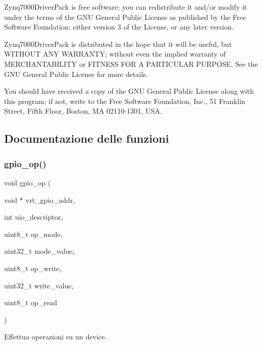 Zynq7000\+Driver\+Pack is free software; you can redistribute it and/or modify it under the terms of the G\+NU General Public License as published by the Free Software Foundation; either version 3 of the License, or any later version.

Zynq7000\+Driver\+Pack is distributed in the hope that it will be useful, but W\+I\+T\+H\+O\+UT A\+NY W\+A\+R\+R\+A\+N\+TY; without even the implied warranty of M\+E\+R\+C\+H\+A\+N\+T\+A\+B\+I\+L\+I\+TY or F\+I\+T\+N\+E\+SS F\+OR A P\+A\+R\+T\+I\+C\+U\+L\+AR P\+U\+R\+P\+O\+SE. See the G\+NU General Public License for more details.

You should have received a copy of the G\+NU General Public License along with this program; if not, write to the Free Software Foundation, Inc., 51 Franklin Street, Fifth Floor, Boston, MA 02110-\/1301, U\+SA. 

\subsection{Documentazione delle funzioni}
\mbox{\label{uio-int_8c_a78b676750c5d08c316cad35ec3963c53}} 
\subsubsection{\texorpdfstring{gpio\+\_\+op()}{gpio\_op()}}
{\footnotesize\ttfamily void gpio\+\_\+op (\begin{DoxyParamCaption}\item[{void $\ast$}]{vrt\+\_\+gpio\+\_\+addr,  }\item[{int}]{uio\+\_\+descriptor,  }\item[{uint8\+\_\+t}]{op\+\_\+mode,  }\item[{uint32\+\_\+t}]{mode\+\_\+value,  }\item[{uint8\+\_\+t}]{op\+\_\+write,  }\item[{uint32\+\_\+t}]{write\+\_\+value,  }\item[{uint8\+\_\+t}]{op\+\_\+read }\end{DoxyParamCaption})}



Effettua operazioni su un device. 


